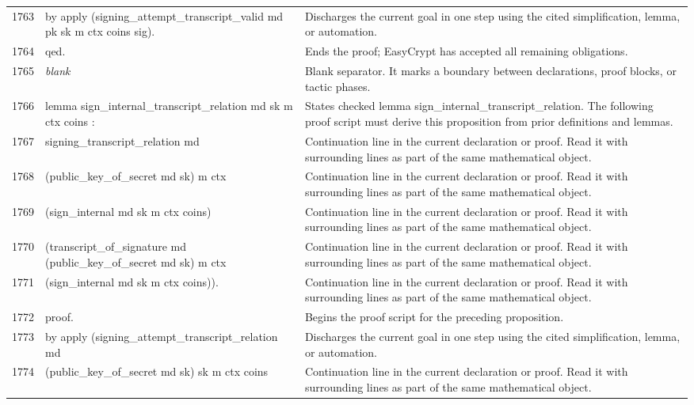 \documentclass[10pt]{article}
\begin{document}
\begin{longtable}{r L{0.53\textwidth} L{0.37\textwidth}}
1763 & {\ttfamily\scriptsize by apply (signing\_attempt\_transcript\_valid md pk sk m ctx coins sig).} & Discharges the current goal in one step using the cited simplification, lemma, or automation. \\
1764 & {\ttfamily\scriptsize qed.} & Ends the proof; EasyCrypt has accepted all remaining obligations. \\
1765 & {\ttfamily\scriptsize \emph{blank}} & Blank separator.  It marks a boundary between declarations, proof blocks, or tactic phases. \\
1766 & {\ttfamily\scriptsize lemma sign\_internal\_transcript\_relation md sk m ctx coins :} & States checked lemma sign\_internal\_transcript\_relation.  The following proof script must derive this proposition from prior definitions and lemmas. \\
1767 & {\ttfamily\scriptsize   signing\_transcript\_relation md} & Continuation line in the current declaration or proof.  Read it with surrounding lines as part of the same mathematical object. \\
1768 & {\ttfamily\scriptsize     (public\_key\_of\_secret md sk) m ctx} & Continuation line in the current declaration or proof.  Read it with surrounding lines as part of the same mathematical object. \\
1769 & {\ttfamily\scriptsize     (sign\_internal md sk m ctx coins)} & Continuation line in the current declaration or proof.  Read it with surrounding lines as part of the same mathematical object. \\
1770 & {\ttfamily\scriptsize     (transcript\_of\_signature md (public\_key\_of\_secret md sk) m ctx} & Continuation line in the current declaration or proof.  Read it with surrounding lines as part of the same mathematical object. \\
1771 & {\ttfamily\scriptsize       (sign\_internal md sk m ctx coins)).} & Continuation line in the current declaration or proof.  Read it with surrounding lines as part of the same mathematical object. \\
1772 & {\ttfamily\scriptsize proof.} & Begins the proof script for the preceding proposition. \\
1773 & {\ttfamily\scriptsize by apply (signing\_attempt\_transcript\_relation md} & Discharges the current goal in one step using the cited simplification, lemma, or automation. \\
1774 & {\ttfamily\scriptsize             (public\_key\_of\_secret md sk) sk m ctx coins} & Continuation line in the current declaration or proof.  Read it with surrounding lines as part of the same mathematical object. \\

\end{longtable}
\end{document}
